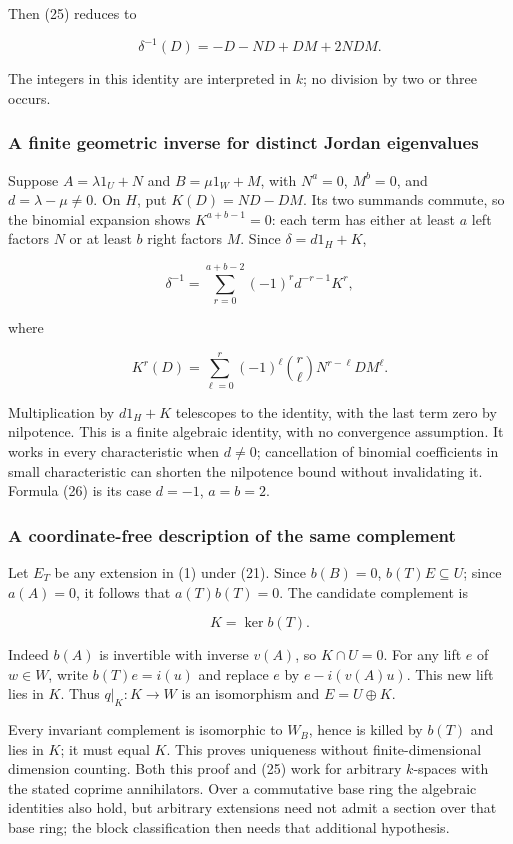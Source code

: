\documentclass[
  11pt,
]{article}
\begin{document}
Then (25) reduces to

\[\delta^{-1}(D)=-D-ND+DM+2NDM.\tag{26}\]

The integers in this identity are interpreted in \(k\); no division by
two or three occurs.

\subsubsection{A finite geometric inverse for distinct Jordan
eigenvalues}\label{a-finite-geometric-inverse-for-distinct-jordan-eigenvalues}

Suppose \(A=\lambda1_U+N\) and \(B=\mu1_W+M\), with \(N^a=0\),
\(M^b=0\), and \(d=\lambda-\mu\ne0\). On \(H\), put \(K(D)=ND-DM\). Its
two summands commute, so the binomial expansion shows \(K^{a+b-1}=0\):
each term has either at least \(a\) left factors \(N\) or at least \(b\)
right factors \(M\). Since \(\delta=d1_H+K\),

\[\delta^{-1}=\sum_{r=0}^{a+b-2}(-1)^r d^{-r-1}K^r,\]

where

\[K^r(D)=\sum_{\ell=0}^r(-1)^\ell\binom r\ell
N^{r-\ell}DM^\ell.\]

Multiplication by \(d1_H+K\) telescopes to the identity, with the last
term zero by nilpotence. This is a finite algebraic identity, with no
convergence assumption. It works in every characteristic when \(d\ne0\);
cancellation of binomial coefficients in small characteristic can
shorten the nilpotence bound without invalidating it. Formula (26) is
its case \(d=-1\), \(a=b=2\).

\subsubsection{A coordinate-free description of the same
complement}\label{a-coordinate-free-description-of-the-same-complement}

Let \(E_T\) be any extension in (1) under (21). Since \(b(B)=0\),
\(b(T)E\subseteq U\); since \(a(A)=0\), it follows that \(a(T)b(T)=0\).
The candidate complement is

\[K=\ker b(T).\tag{27}\]

Indeed \(b(A)\) is invertible with inverse \(v(A)\), so \(K\cap U=0\).
For any lift \(e\) of \(w\in W\), write \(b(T)e=i(u)\) and replace \(e\)
by \(e-i(v(A)u)\). This new lift lies in \(K\). Thus \(q|_K:K\to W\) is
an isomorphism and \(E=U\oplus K\).

Every invariant complement is isomorphic to \(W_B\), hence is killed by
\(b(T)\) and lies in \(K\); it must equal \(K\). This proves uniqueness
without finite-dimensional dimension counting. Both this proof and (25)
work for arbitrary \(k\)-spaces with the stated coprime annihilators.
Over a commutative base ring the algebraic identities also hold, but
arbitrary extensions need not admit a section over that base ring; the
block classification then needs that additional hypothesis.
\end{document}
